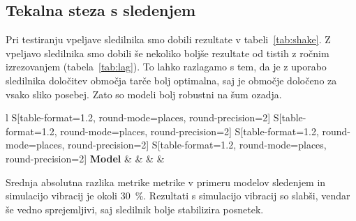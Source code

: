 \subsection{Tekalna steza s sledenjem}
Pri testiranju vpeljave sledilnika smo dobili rezultate v tabeli~\ref{tab:shake}. Z vpeljavo sledilnika smo dobili še nekoliko boljše rezultate od tistih z ročnim izrezovanjem (tabela~\ref{tab:lag}). To lahko razlagamo s tem, da je z uporabo sledilnika določitev območja tarče bolj optimalna, saj je območje določeno za vsako sliko posebej. Zato so modeli bolj robustni na šum ozadja.




\begin{table}[!htbp]
	\centering
	\begin{tabular}{l S[table-format=1.2, round-mode=places, round-precision=2] S[table-format=1.2, round-mode=places, round-precision=2] S[table-format=1.2, round-mode=places, round-precision=2] S[table-format=1.2, round-mode=places, round-precision=2]}
		\toprule
		\textbf{Model} & \thead{\corr} & \thead{\rae} & \thead{\rrse} & \theadm{\nsv}\\
		\midrule
		\bottomrule
	\end{tabular}
	\caption[Rezultati tekalne steze s sledenjem]{Rezultati tekalne steze s sledenjem. Pri modelih s končnico \textit{sh} smo uporabili simulacijo vibracij. Modeli \textit{tr} so brez vibracij.}
	\label{tab:shake}
\end{table}


Srednja absolutna razlika metrike \rrse metrike v primeru modelov sledenjem in simulacijo vibracij je okoli \SI{30}{\%}. Rezultati s simulacijo vibracij so slabši, vendar še vedno sprejemljivi, saj sledilnik bolje stabilizira posnetek.











